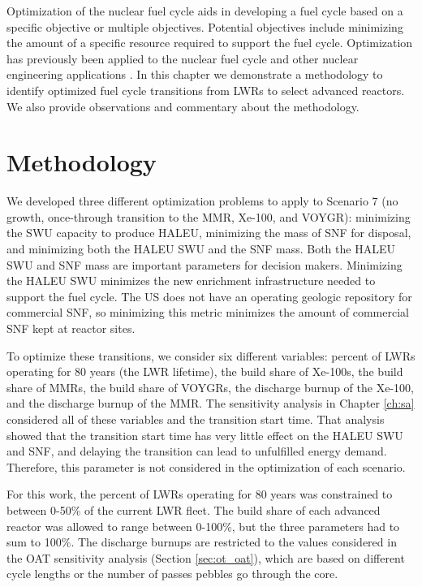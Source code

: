 Optimization of the nuclear fuel cycle aids in developing
a fuel cycle based on a specific objective or  multiple objectives. 
Potential objectives include minimizing the amount of a specific 
resource required to support the fuel cycle. 
Optimization has previously been applied to the nuclear fuel 
cycle \cite{passerini_sensitivity_2012,andrianov_optimization_2019}
and other nuclear engineering applications 
\cite{chee_fluoride-salt-cooled_2022}.
In this chapter we demonstrate a methodology to identify
optimized fuel cycle transitions from \glspl{LWR} to select 
advanced reactors. We also provide observations and 
commentary about the methodology. 

\section{Methodology}
We developed three different optimization problems to apply to 
Scenario 7 (no growth, once-through transition to the \gls{MMR}, Xe-100, 
and VOYGR): minimizing the \gls{SWU} capacity to 
produce \gls{HALEU}, minimizing the mass of \gls{SNF} for disposal, 
and minimizing both the \gls{HALEU} \gls{SWU} and the \gls{SNF} 
mass. Both the \gls{HALEU} \gls{SWU} and \gls{SNF} mass are important 
parameters for decision makers. Minimizing the \gls{HALEU} \gls{SWU} 
minimizes the new enrichment infrastructure needed to support the 
fuel cycle. The US does not have an operating geologic 
repository for commercial \gls{SNF}, so minimizing this metric 
minimizes the amount of commercial \gls{SNF} kept at reactor 
sites. 

To optimize these transitions, we consider six different 
variables: percent of \glspl{LWR} operating for 80 years (the \gls{LWR} 
lifetime), the build share 
of Xe-100s, the build share of \glspl{MMR}, the build share of VOYGRs, 
the discharge burnup of the Xe-100, and the discharge burnup of the 
\gls{MMR}. The sensitivity analysis in Chapter \ref{ch:sa} considered 
all of these variables and the transition start time. That analysis 
showed that the transition start time has
very little effect on the \gls{HALEU} \gls{SWU} and \gls{SNF},
and delaying the transition 
can lead to unfulfilled energy demand. Therefore, this parameter is 
not considered in the optimization of each scenario. 

For this work, the percent of \glspl{LWR} operating for 80 years 
was constrained to between 0-50\% of the current \gls{LWR} fleet. 
The build share of each advanced reactor was allowed to range between 
0-100\%, but the three parameters had to sum to 100\%. The discharge 
burnups are restricted to the values considered in the \gls{OAT} 
sensitivity analysis (Section \ref{sec:ot_oat}), which are based 
on different cycle lengths or 
the number of passes pebbles go through the core.

